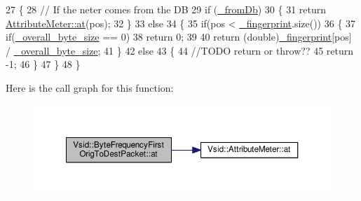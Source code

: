 \begin{DoxyCode}
27 \{
28     \textcolor{comment}{// If the neter comes from the DB}
29     \textcolor{keywordflow}{if} (\hyperlink{class_vsid_1_1_attribute_meter_a2ce3946fc699d3c375ee4019a9e3c022}{\_fromDb})
30     \{
31         \textcolor{keywordflow}{return} \hyperlink{class_vsid_1_1_attribute_meter_a3b067be638ae613a732fa090c07c5e71}{AttributeMeter::at}(pos);
32     \}
33     \textcolor{keywordflow}{else}
34     \{
35         \textcolor{keywordflow}{if}(pos < \hyperlink{class_vsid_1_1_attribute_meter_a0386b2fe9c5d6ab6fba16029d8da4efe}{\_fingerprint}.size())
36         \{
37             \textcolor{keywordflow}{if}(\hyperlink{class_vsid_1_1_byte_frequency_first_orig_to_dest_packet_afaa99faf2c05ab93ed2cc21e581c4ece}{\_overall\_byte\_size} == 0)
38                 \textcolor{keywordflow}{return} 0;
39             
40             \textcolor{keywordflow}{return} (\textcolor{keywordtype}{double})\hyperlink{class_vsid_1_1_attribute_meter_a0386b2fe9c5d6ab6fba16029d8da4efe}{\_fingerprint}[pos] / \hyperlink{class_vsid_1_1_byte_frequency_first_orig_to_dest_packet_afaa99faf2c05ab93ed2cc21e581c4ece}{\_overall\_byte\_size};
41         \}
42         \textcolor{keywordflow}{else}
43         \{
44             \textcolor{comment}{//TODO return or throw??}
45             \textcolor{keywordflow}{return} -1;
46         \}
47     \}
48 \}
\end{DoxyCode}


Here is the call graph for this function\-:
\nopagebreak
\begin{figure}[H]
\begin{center}
\leavevmode
\includegraphics[width=350pt]{class_vsid_1_1_byte_frequency_first_orig_to_dest_packet_a60c657add025410076184f5bc88bee4b_cgraph}
\end{center}
\end{figure}


